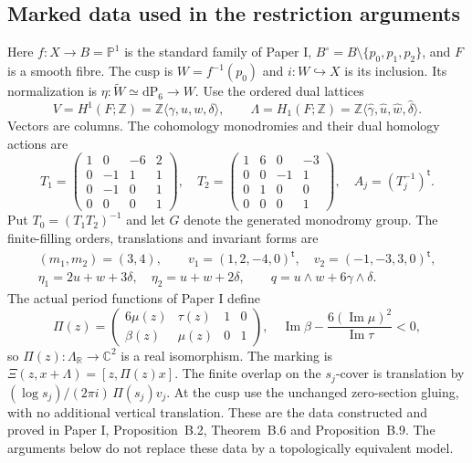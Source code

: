 \subsection{Marked data used in the restriction arguments}
Here $f:X\to B=\mathbb P^1$ is the standard family of Paper I,
$B^\circ=B\setminus\{p_0,p_1,p_2\}$, and $F$ is a smooth fibre.
The cusp is $W=f^{-1}(p_0)$ and $i:W\hookrightarrow X$ is its inclusion.
Its normalization is $\eta:\widetilde W\simeq\mathrm{dP}_6\to W$.
Use the ordered dual lattices
\[
 V=H^1(F;\mathbb Z)=\mathbb Z\langle\gamma,u,w,\delta\rangle,
 \qquad
 \Lambda=H_1(F;\mathbb Z)
 =\mathbb Z\langle\widehat\gamma,\widehat u,\widehat w,\widehat\delta\rangle.
\]
Vectors are columns. The cohomology monodromies and their dual homology
actions are
\[
T_1=\begin{pmatrix}1&0&-6&2\\0&-1&1&1\\0&-1&0&1\\0&0&0&1\end{pmatrix},
\quad
T_2=\begin{pmatrix}1&6&0&-3\\0&0&-1&1\\0&1&0&0\\0&0&0&1\end{pmatrix},
\quad A_j=(T_j^{-1})^{\mathsf t}.
\]
Put $T_0=(T_1T_2)^{-1}$ and let $G$ denote the generated monodromy group.
The finite-filling orders, translations and invariant forms are
\[
\begin{gathered}
(m_1,m_2)=(3,4),\qquad
v_1=(1,2,-4,0)^{\mathsf t},\quad v_2=(-1,-3,3,0)^{\mathsf t},\\
\eta_1=2u+w+3\delta,\quad \eta_2=u+w+2\delta,
\qquad q=u\wedge w+6\gamma\wedge\delta.
\end{gathered}
\]
The actual period functions of Paper I define
\[
\Pi(z)=\begin{pmatrix}6\mu(z)&\tau(z)&1&0\\
\beta(z)&\mu(z)&0&1\end{pmatrix},
\quad
\operatorname{Im}\beta-
\frac{6(\operatorname{Im}\mu)^2}{\operatorname{Im}\tau}<0,
\]
so $\Pi(z):\Lambda_{\mathbb R}\to\mathbb C^2$ is a real isomorphism.
The marking is $\Xi(z,x+\Lambda)=[z,\Pi(z)x]$.
The finite overlap on the $s_j$-cover is translation by
$(\log s_j)/(2\pi i)\,\Pi(s_j)v_j$.
At the cusp use the unchanged zero-section gluing, with no additional
vertical translation. These are the data constructed and proved in
Paper I, Proposition~B.2, Theorem~B.6 and Proposition~B.9. The arguments
below do not replace these data by a topologically equivalent model.

